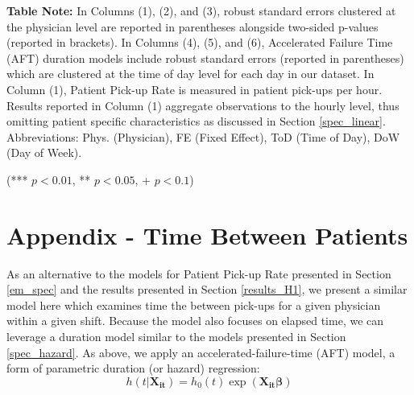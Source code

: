 \begin{table}[htbp]
{\begin{threeparttable}[t]
\begin{tablenotes}
      \item \textbf{Table Note:} In Columns (1), (2), and (3), robust standard errors clustered at the physician level are reported in parentheses alongside two-sided p-values (reported in brackets). In Columns (4), (5), and (6), Accelerated Failure Time (AFT) duration models include robust standard errors (reported in parentheses) which are clustered at the time of day level for each day in our dataset. In Column (1), Patient Pick-up Rate is measured in patient pick-ups per hour. Results reported in Column (1) aggregate observations to the hourly level, thus omitting patient specific characteristics as discussed in Section \ref{spec_linear}. Abbreviations: Phys. (Physician), FE (Fixed Effect), ToD (Time of Day), DoW (Day of Week). %
      \item (*** $p < 0.01$, ** $p < 0.05$, + $p < 0.1$)
    \end{tablenotes}
  \end{threeparttable} }
 \end{table}

\section{Appendix - Time Between Patients} \label{app_pu_hazard_between}
 As an alternative to the models for Patient Pick-up Rate presented in Section \ref{em_spec} and the results presented in Section \ref{results_H1}, we present a similar model here which examines time the between pick-ups for a given physician within a given shift. Because the model also focuses on elapsed time, we can leverage a duration model similar to the models presented in Section \ref{spec_hazard}. As above, we apply an accelerated-failure-time (AFT) model, a form of parametric duration (or hazard) regression:
  \begin{equation}
  h(t|\boldsymbol{X_{it}}) = h_0(t) \exp(\boldsymbol{X_{it}} \boldsymbol{\beta})
  \end{equation}
 
